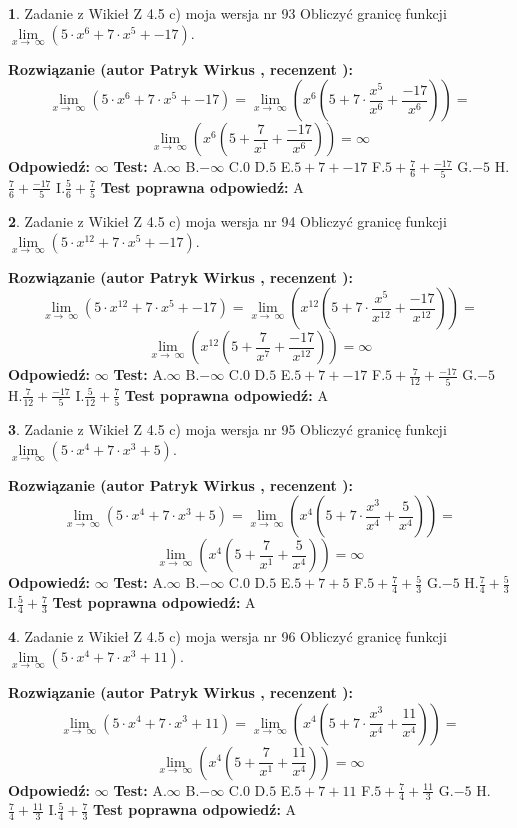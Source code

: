\documentclass[12pt, a4paper]{article}
\theoremstyle{definition} %
\newtheorem{zad}{}
\newcommand{\zadStart}[1]{\begin{zad}#1\newline}
\newcommand{\zadStop}{\end{zad}}
\newcommand{\rozwStart}[2]{\noindent \textbf{Rozwiązanie (autor #1 , recenzent #2): }\newline}
\newcommand{\rozwStop}{\newline}
\newcommand{\odpStart}{\noindent \textbf{Odpowiedź:}\newline}
\newcommand{\odpStop}{\newline}
\newcommand{\testStart}{\noindent \textbf{Test:}\newline}
\newcommand{\testStop}{\newline}
\newcommand{\kluczStart}{\noindent \textbf{Test poprawna odpowiedź:}\newline}
\newcommand{\kluczStop}{\newline}
\begin{document}
\zadStart{Zadanie z Wikieł Z 4.5 c) moja wersja nr 93}
Obliczyć granicę funkcji  $\lim\limits_{x\to\ \infty}(5 \cdot x^{6}+7 \cdot x^{5}+-17)$.
\zadStop
\rozwStart{Patryk Wirkus}{}
$$\lim\limits_{x\to\ \infty}(5 \cdot x^{6}+7 \cdot x^{5}+-17) = \lim\limits_{x\to\ \infty}(x^{6}(5 +7 \cdot \frac{x^{5}}{x^{6}}+\frac{-17}{x^{6}})) =$$ $$\lim\limits_{x\to\ \infty}(x^{6}(5 +\frac{7}{x^{1}}+\frac{-17}{x^{6}})) =\infty$$
\rozwStop
\odpStart
$\infty$
\odpStop
\testStart
A.$\infty$ B.$-\infty$ C.$0$ D.$5$ E.$5 + 7 + -17$
F.$5+\frac{7}{6}+\frac{-17}{5}$ G.$-5$
H.$\frac{7}{6}+\frac{-17}{5}$
I.$\frac{5}{6}+\frac{7}{5}$
\testStop
\kluczStart
A
\kluczStop



\zadStart{Zadanie z Wikieł Z 4.5 c) moja wersja nr 94}
Obliczyć granicę funkcji  $\lim\limits_{x\to\ \infty}(5 \cdot x^{12}+7 \cdot x^{5}+-17)$.
\zadStop
\rozwStart{Patryk Wirkus}{}
$$\lim\limits_{x\to\ \infty}(5 \cdot x^{12}+7 \cdot x^{5}+-17) = \lim\limits_{x\to\ \infty}(x^{12}(5 +7 \cdot \frac{x^{5}}{x^{12}}+\frac{-17}{x^{12}})) =$$ $$\lim\limits_{x\to\ \infty}(x^{12}(5 +\frac{7}{x^{7}}+\frac{-17}{x^{12}})) =\infty$$
\rozwStop
\odpStart
$\infty$
\odpStop
\testStart
A.$\infty$ B.$-\infty$ C.$0$ D.$5$ E.$5 + 7 + -17$
F.$5+\frac{7}{12}+\frac{-17}{5}$ G.$-5$
H.$\frac{7}{12}+\frac{-17}{5}$
I.$\frac{5}{12}+\frac{7}{5}$
\testStop
\kluczStart
A
\kluczStop



\zadStart{Zadanie z Wikieł Z 4.5 c) moja wersja nr 95}
Obliczyć granicę funkcji  $\lim\limits_{x\to\ \infty}(5 \cdot x^{4}+7 \cdot x^{3}+5)$.
\zadStop
\rozwStart{Patryk Wirkus}{}
$$\lim\limits_{x\to\ \infty}(5 \cdot x^{4}+7 \cdot x^{3}+5) = \lim\limits_{x\to\ \infty}(x^{4}(5 +7 \cdot \frac{x^{3}}{x^{4}}+\frac{5}{x^{4}})) =$$ $$\lim\limits_{x\to\ \infty}(x^{4}(5 +\frac{7}{x^{1}}+\frac{5}{x^{4}})) =\infty$$
\rozwStop
\odpStart
$\infty$
\odpStop
\testStart
A.$\infty$ B.$-\infty$ C.$0$ D.$5$ E.$5 + 7 + 5$
F.$5+\frac{7}{4}+\frac{5}{3}$ G.$-5$
H.$\frac{7}{4}+\frac{5}{3}$
I.$\frac{5}{4}+\frac{7}{3}$
\testStop
\kluczStart
A
\kluczStop



\zadStart{Zadanie z Wikieł Z 4.5 c) moja wersja nr 96}
Obliczyć granicę funkcji  $\lim\limits_{x\to\ \infty}(5 \cdot x^{4}+7 \cdot x^{3}+11)$.
\zadStop
\rozwStart{Patryk Wirkus}{}
$$\lim\limits_{x\to\ \infty}(5 \cdot x^{4}+7 \cdot x^{3}+11) = \lim\limits_{x\to\ \infty}(x^{4}(5 +7 \cdot \frac{x^{3}}{x^{4}}+\frac{11}{x^{4}})) =$$ $$\lim\limits_{x\to\ \infty}(x^{4}(5 +\frac{7}{x^{1}}+\frac{11}{x^{4}})) =\infty$$
\rozwStop
\odpStart
$\infty$
\odpStop
\testStart
A.$\infty$ B.$-\infty$ C.$0$ D.$5$ E.$5 + 7 + 11$
F.$5+\frac{7}{4}+\frac{11}{3}$ G.$-5$
H.$\frac{7}{4}+\frac{11}{3}$
I.$\frac{5}{4}+\frac{7}{3}$
\testStop
\kluczStart
A
\kluczStop
\end{document}
